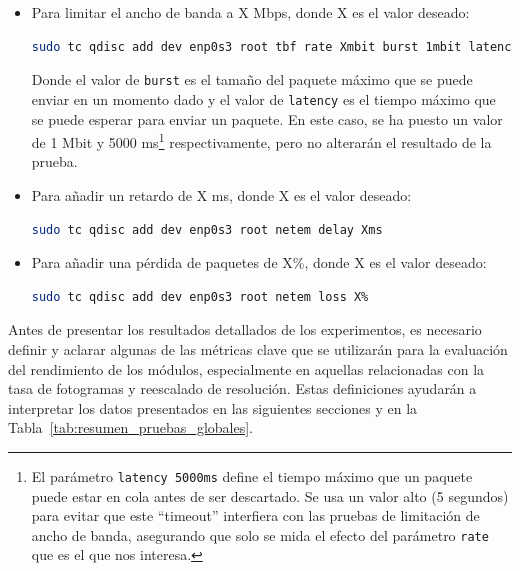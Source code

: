 \begin{itemize}
    \item Para limitar el ancho de banda a X Mbps, donde X es el valor deseado:
    \begin{lstlisting}[language=bash, breaklines=true]
    sudo tc qdisc add dev enp0s3 root tbf rate Xmbit burst 1mbit latency 5000ms
\end{lstlisting}
    Donde el valor de \texttt{burst} es el tamaño del paquete máximo que se puede enviar en un momento dado y el valor de \texttt{latency} es el tiempo máximo que se puede esperar para enviar un paquete. En este caso, se ha puesto un valor de 1 Mbit y 5000 ms\footnote{El parámetro \texttt{latency 5000ms} define el tiempo máximo que un paquete puede estar en cola antes de ser descartado. Se usa un valor alto (5 segundos) para evitar que este ``timeout'' interfiera con las pruebas de limitación de ancho de banda, asegurando que solo se mida el efecto del parámetro \texttt{rate} que es el que nos interesa.} respectivamente, pero no alterarán el resultado de la prueba.
    \item Para añadir un retardo de X ms, donde X es el valor deseado:
    \begin{lstlisting}[language=bash]
    sudo tc qdisc add dev enp0s3 root netem delay Xms
\end{lstlisting}
    \item Para añadir una pérdida de paquetes de X\%, donde X es el valor deseado:
    \begin{lstlisting}[language=bash]
    sudo tc qdisc add dev enp0s3 root netem loss X%
\end{lstlisting}
\end{itemize}


\newpage

Antes de presentar los resultados detallados de los experimentos, es necesario definir y aclarar algunas de las métricas clave que se utilizarán para la evaluación del rendimiento de los módulos, especialmente en aquellas relacionadas con la tasa de fotogramas y reescalado de resolución. Estas definiciones ayudarán a interpretar los datos presentados en las siguientes secciones y en la Tabla~\ref{tab:resumen_pruebas_globales}.

